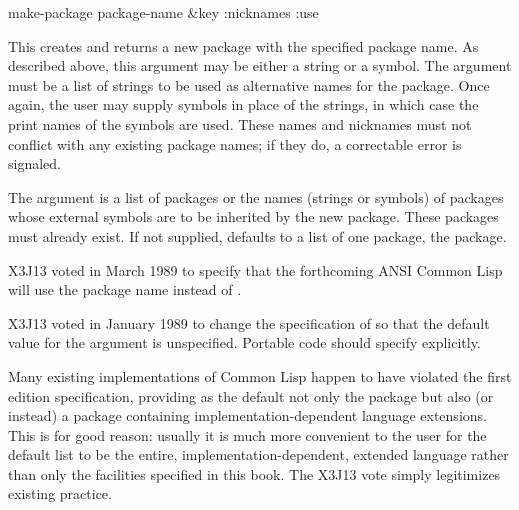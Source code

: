 \begin{defun}[Function]
make-package package-name &key :nicknames :use

This creates and returns a new package with the specified package name.  As
described above, this argument may be either a string or a symbol.  The
 argument must be a list of strings to be used as
alternative names for the package.  Once again, the user may supply
symbols in place of the strings, in which case the print names of the
symbols are used.  These names and nicknames must not conflict with
any existing package names; if they do, a correctable error is
signaled.

The  argument is a list of packages or the names (strings or
symbols) of packages whose external symbols are to be inherited by the
new package.  These packages must already exist.  If not supplied,
 defaults to a list of one package, the  package.

\begin{newer}
X3J13 voted in March 1989  to specify that
the forthcoming ANSI Common Lisp will use the package name 
instead of .
\end{newer}

\begin{new}
X3J13 voted in January 1989
to change the specification of  so that the default value
for the  argument is unspecified.  Portable code should
specify  explicitly.

\beforenoterule
\begin{rationale}
Many existing implementations of Common Lisp happen to have violated
the first edition specification, providing as the default not only
the  package but also (or instead) a package containing
implementation-dependent language extensions.
This is for good reason: usually it is much
more convenient to the user for the default  list to be
the entire, implementation-dependent, extended language rather
than only the facilities specified in this book.  The X3J13 vote
simply legitimizes existing practice.
\end{rationale}
\afternoterule
\end{new}
\end{defun}


